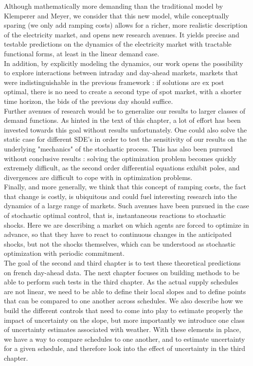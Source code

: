 Although mathematically more demanding than the traditional model by Klemperer and Meyer, we consider that this new model, while conceptually sparing (we only add ramping costs) allows for a richer, more realistic description of the electricity market, and opens new research avenues.  It yields precise and testable predictions on the dynamics of the electricity market with tractable functional forms, at least in the linear demand case. \\

In addition, by explicitly modeling the dynamics, our work opens the possibility to explore interactions between intraday and day-ahead markets, markets that were indistinguishable in the previous framework : if solutions are ex post optimal, there is no need to create a second type of spot market, with a shorter time horizon, the bids of the previous day should suffice. \\

Further avenues of research would be to generalize our results to larger classes of demand functions. As hinted in the text of this chapter, a lot of effort has been invested towards this goal without results unfortunately. One could also solve the static case for different SDE's in order to test the sensitivity of our results on the underlying "mechanics" of the stochastic process. This has also been pursued without conclusive results : solving the optimization problem becomes quickly extremely difficult, as the second order differential equations exhibit poles, and divergences are difficult to cope with in optimization problems.\\

Finally, and more generally, we think that this concept of ramping costs, the fact that change is costly, is ubiquitous and could fuel interesting research into the dynamics of a large range of markets. Such avenues have been pursued in the case of stochastic optimal control, that is, instantaneous reactions to stochastic shocks. Here we are describing a market on which agents are forced to optimize in advance, so that they have to react to continuous changes in the anticipated shocks, but not the shocks themselves, which can be understood as stochastic optimization with periodic commitment. \\

The goal of the second and third chapter is to test these theoretical predictions on french day-ahead data. The next chapter focuses on building methods to be able to perform such tests in the third chapter. As the actual supply schedules are not linear, we need to be able to define their local slopes and to define points that can be compared to one another across schedules. We also describe how we build the different controls that need to come into play to estimate properly the impact of uncertainty on the slope, but more importantly we introduce one class of uncertainty estimates associated with weather. With these elements in place, we have a way to compare schedules to one another, and to estimate uncertainty for a given schedule, and therefore look into the effect of uncertainty in the third chapter. 

